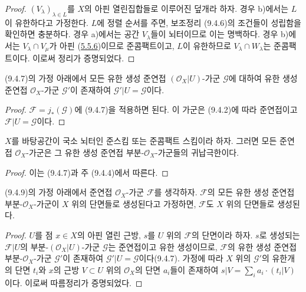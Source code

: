
\begin{proof}
$(V_\lambda)_{\lambda\in L}$를 $X$의 아핀 열린집합들로 이루어진
덮개라 하자. 경우 b)에서는 $L$이 유한하다고 가정한다. $L$에
정렬 순서를 주면, 보조정리 (9.4.6)의 조건들이 성립함을 확인하면
충분하다. 경우 a)에서는 공간 $V_\lambda$들이 뇌터이므로 이는
명백하다. 경우 b)에서는 $V_\lambda\cap V_\mu$가 아핀
(\hyperref[I.5.5.6-ko]{5.5.6})이므로 준콤팩트이고, $L$이 유한하므로
$V_\lambda\cap W_\lambda$는 준콤팩트이다. 이로써 정리가 증명되었다.
\end{proof}

\begin{corollary}[9.4.8]
\label{I.9.4.8-ko}
(9.4.7)의 가정 아래에서 모든 유한 생성 준연접
$(\mathscr{O}_X|U)$-가군 $\mathscr{G}$에 대하여 유한 생성 준연접
$\mathscr{O}_X$-가군 $\mathscr{G}'$이 존재하여
$\mathscr{G}'|U=\mathscr{G}$이다.
\end{corollary}

\begin{proof}
$\mathscr{F}=j_*(\mathscr{G})$에 (9.4.7)을 적용하면 된다. 이 가군은
(9.4.2)에 따라 준연접이고 $\mathscr{F}|U=\mathscr{G}$이다.
\end{proof}

\begin{corollary}[9.4.9]
\label{I.9.4.9-ko}
$X$를 바탕공간이 국소 뇌터인 준스킴 또는 준콤팩트 스킴이라 하자.
그러면 모든 준연접 $\mathscr{O}_X$-가군은 그 유한 생성 준연접
부분-$\mathscr{O}_X$-가군들의 귀납극한이다.
\end{corollary}

\begin{proof}
이는 (9.4.7)과 주 (9.4.4)에서 따른다.
\end{proof}

\begin{corollary}[9.4.10]
\label{I.9.4.10-ko}
(9.4.9)의 가정 아래에서 준연접 $\mathscr{O}_X$-가군
$\mathscr{F}$를 생각하자. $\mathscr{F}$의 모든 유한 생성 준연접
부분-$\mathscr{O}_X$-가군이 $X$ 위의 단면들로 생성된다고 가정하면,
$\mathscr{F}$도 $X$ 위의 단면들로 생성된다.
\end{corollary}

\begin{proof}
$U$를 점 $x\in X$의 아핀 열린 근방, $s$를 $U$ 위의
$\mathscr{F}$의 단면이라 하자. $s$로 생성되는 $\mathscr{F}|U$의
부분-$(\mathscr{O}_X|U)$-가군 $\mathscr{G}$는 준연접이고 유한 생성이므로,
$\mathscr{F}$의 유한 생성 준연접 부분-$\mathscr{O}_X$-가군
$\mathscr{G}'$이 존재하여 $\mathscr{G}'|U=\mathscr{G}$이다(9.4.7).
가정에 따라 $X$ 위의 $\mathscr{G}'$의 유한개의 단면 $t_i$와
$x$의 근방 $V\subset U$ 위의 $\mathscr{O}_X$의 단면 $a_i$들이 존재하여
$s|V=\sum_i a_i\mathbin{\cdot}(t_i|V)$이다. 이로써 따름정리가
증명되었다.
\end{proof}


